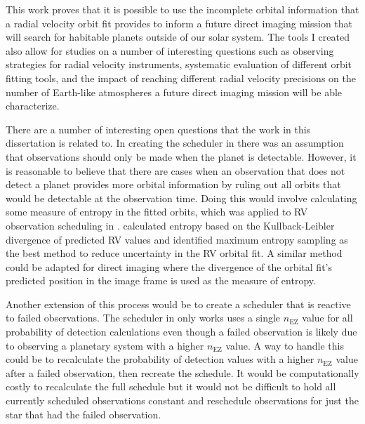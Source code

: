 This work proves that it is possible to use the incomplete orbital information
that a radial velocity orbit fit provides to inform a future direct imaging
mission that will search for habitable planets outside of our solar system. The
tools I created also allow for studies on a number of interesting questions
such as observing strategies for radial velocity instruments, systematic
evaluation of different orbit fitting tools, and the impact of reaching
different radial velocity precisions on the number of Earth-like atmospheres a
future direct imaging mission will be able characterize.

There are a number of interesting open questions that the work in this
dissertation is related to. In creating the scheduler in
 there was an assumption that observations should
only be made when the planet is detectable. However, it is reasonable to
believe that there are cases when an observation that does not detect a planet
provides more orbital information by ruling out all orbits that would be
detectable at the observation time. Doing this would involve calculating some
measure of entropy in the fitted orbits, which was applied to RV observation
scheduling in \citet{loredoBayesianMethodsAnalysis2012}.
\citet{loredoBayesianMethodsAnalysis2012} calculated entropy based on the
Kullback-Leibler divergence of predicted RV values and identified maximum
entropy sampling as the best method to reduce uncertainty in the RV orbital
fit. A similar method could be adapted for direct imaging where the divergence
of the orbital fit's predicted position in the image frame is used as the
measure of entropy.

Another extension of this process would be to create a scheduler that is
reactive to failed observations. The scheduler in 
only works uses a single $n_\textrm{EZ}$ value for all probability of detection
calculations even though a failed observation is likely due to observing a
planetary system with a higher $n_\textrm{EZ}$ value. A way to handle this
could be to recalculate the probability of detection values with a higher
$n_\textrm{EZ}$ value after a failed observation, then recreate the schedule.
It would be computationally costly to recalculate the full schedule but it
would not be difficult to hold all currently scheduled observations constant
and reschedule observations for just the star that had the failed observation.

